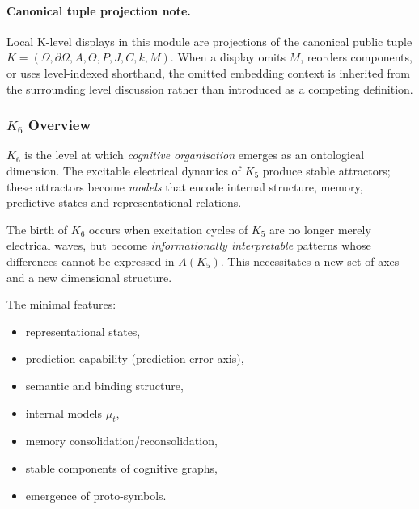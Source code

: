 



\paragraph{Canonical tuple projection note.}
Local K-level displays in this module are projections of the canonical public tuple \(K=(\Omega,\partial\Omega,A,\Theta,P,J,C,k,M)\). When a display omits \(M\), reorders components, or uses level-indexed shorthand, the omitted embedding context is inherited from the surrounding level discussion rather than introduced as a competing definition.

\subsubsection{\texorpdfstring{$K_6$}{K_6} Overview}
\label{sec:k6-overview}

$K_6$ is the level at which \emph{cognitive organisation} emerges as an
ontological dimension. The excitable electrical dynamics of $K_5$
produce stable attractors; these attractors become \emph{models} that
encode internal structure, memory, predictive states and representational
relations.

The birth of $K_6$ occurs when excitation cycles of $K_5$ are no longer
merely electrical waves, but become \emph{informationally interpretable}
patterns whose differences cannot be expressed in $A(K_5)$. This
necessitates a new set of axes and a new dimensional structure.

The minimal features:
\begin{itemize}
    \item representational states,
    \item prediction capability (prediction error axis),
    \item semantic and binding structure,
    \item internal models $\mu_t$,
    \item memory consolidation/reconsolidation,
    \item stable components of cognitive graphs,
    \item emergence of proto-symbols.
\end{itemize}

